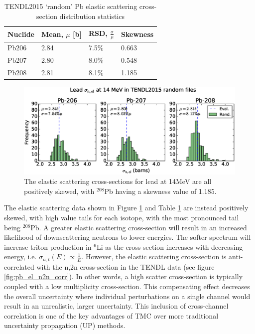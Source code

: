 \begin{table}[ht]
  \footnotesize
  \centering 
  \begin{tabular}{llll}
    \toprule
    Nuclide & Mean, $\mu$ [b] & RSD, $\frac{\sigma}{\mu}$ & Skewness \\
    \midrule
    Pb206 & 2.84 & 7.5\% & 0.663 \\
    Pb207 & 2.80 & 8.0\% & 0.548 \\
    Pb208 & 2.81 & 8.1\% & 1.185 \\
    \bottomrule
  \end{tabular}
  \caption{TENDL2015 `random' Pb elastic scattering cross-section distribution statistics}
  \label{table:nel}
\end{table}

\begin{figure}[ht]
  \includegraphics[width=\textwidth]{pb_tendl_nel_hist}
  \caption{The elastic scattering cross-sections for lead at 14MeV are all positively skewed, with $^{208}$Pb having a skewness value of 1.185.}
  \label{fig:tendl_nel}
\end{figure}

The elastic scattering data shown in Figure \ref{fig:tendl_nel} and Table \ref{table:nel} are instead positively skewed, with high value tails for each isotope, with the most pronounced tail being $^{208}$Pb. A greater elastic scattering cross-section will result in an increased likelihood of downscattering neutrons to lower energies. The softer spectrum will increase triton production in $^{6}$Li as the cross-section increases with decreasing energy, i.e. $\sigma_{n,t}(E) \propto \frac{1}{E}$. However, the elastic scattering cross-section is anti-correlated with the n,2n cross-section in the TENDL data (see figure \ref{fig:pb_el_n2n_corr}). In other words, a high scatter cross-section is typically coupled with a low multiplicity cross-section. This compensating effect decreases the overall uncertainty where individual perturbations on a single channel would result in an unrealistic, larger uncertainty. This inclusion of cross-channel correlation is one of the key advantages of TMC over more traditional uncertainty propagation (UP) methods. 

